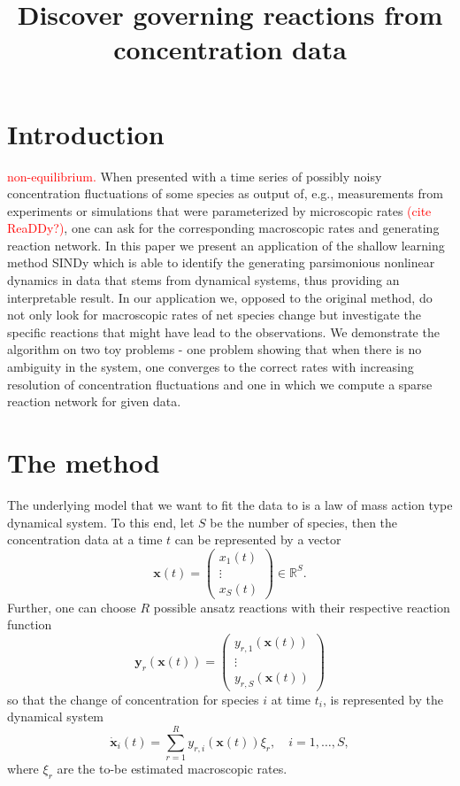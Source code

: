 \documentclass[oneside, abstracton, titlepage]{scrartcl}
\begin{document}
	\title{Discover governing reactions from concentration data}
	\maketitle
	
	\section{Introduction}
	\textcolor{red}{non-equilibrium.}
	When presented with a time series of possibly noisy concentration fluctuations of some species as output of, e.g., measurements from experiments or simulations that were parameterized by microscopic rates \textcolor{red}{(cite ReaDDy?)}, one can ask for the corresponding macroscopic rates and generating reaction network. 
	In this paper we present an application of the shallow learning method SINDy \cite{Brunton2015} which is able to identify the generating parsimonious nonlinear dynamics in data that stems from dynamical systems, thus providing an interpretable result.
	In our application we, opposed to the original method, do not only look for macroscopic rates of net species change but investigate the specific reactions that might have lead to the observations.
	We demonstrate the algorithm on two toy problems - one problem showing that when there is no ambiguity in the system, one converges to the correct rates with increasing resolution of concentration fluctuations and one in which we compute a sparse reaction network for given data.
	
	\section{The method}
	The underlying model that we want to fit the data to is a law of mass action type dynamical system. To this end, let $S$ be the number of species, then the concentration data at a time $t$ can be represented by a vector
	\[
	\mathbf{x}(t)=\begin{pmatrix}
	x_1(t)\\ \vdots \\ x_S(t)
	\end{pmatrix}\in \mathbb{R}^S.
	\]
	Further, one can choose $R$ possible ansatz reactions with their respective reaction function
	\[
	\textbf{y}_r(\textbf{x}(t))=\begin{pmatrix}
	y_{r,1}(\textbf{x}(t)) \\ \vdots \\ y_{r,S}(\textbf{x}(t))
	\end{pmatrix}
	\]
	so that the change of concentration for species $i$ at time $t_i$, is represented by the dynamical system
	\[
	\dot{\textbf{x}}_i(t) = \sum_{r=1}^{R}y_{r,i}(\textbf{x}(t))\xi_r,\quad i=1,\ldots, S,
	\]
	where $\xi_r$ are the to-be estimated macroscopic rates.
	
\end{document}
